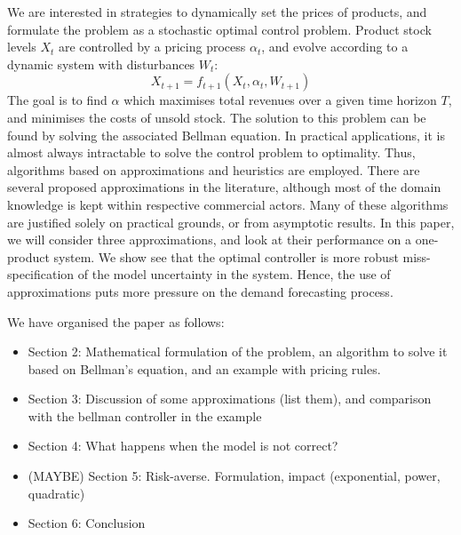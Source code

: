 \documentclass[main.tex]{subfiles}
\begin{document}
We are interested in strategies to dynamically set the prices of products, and
formulate the problem as a stochastic optimal control problem.
Product stock levels $X_t$ are controlled by a pricing process
$\alpha_t$, and evolve according to a dynamic system with disturbances
$W_t$:
\begin{equation}
X_{t+1}=f_{t+1}(X_t,\alpha_t,W_{t+1})
\end{equation}
The goal is to find $\alpha$ which maximises total revenues over a
given time horizon $T$, and
minimises the costs of unsold stock.
The solution to this problem can be found by solving the associated
Bellman equation. In practical applications, it is almost always
intractable to solve the control problem to optimality.
Thus, algorithms based on approximations and heuristics are employed.
There are several proposed approximations in the
literature, although most of the domain knowledge is kept within
respective commercial actors.
Many of these algorithms are justified solely on practical grounds, or
from asymptotic results.
In this paper, we will consider three approximations,
and look at their performance on a one-product system.
We show see that the optimal controller is more robust
miss-specification of the model uncertainty in the system.
Hence, the use of approximations puts more pressure on the
demand forecasting process.

We have organised the paper as follows:
\begin{itemize}
\item Section 2: Mathematical formulation of the problem, an algorithm
  to solve it based on Bellman's equation, and an example with pricing rules.
\item Section 3: Discussion of some approximations (list them), and
  comparison with the bellman controller in the example
\item Section 4: What happens when the model is not correct?
\item (MAYBE) Section 5: Risk-averse. Formulation, impact
  (exponential, power, quadratic)
\item Section 6: Conclusion
\end{itemize}


\biblio
\end{document}
